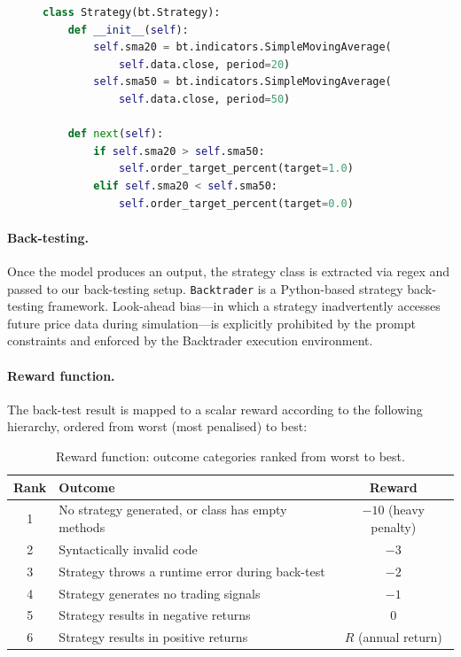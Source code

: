 \documentclass[12pt, a4paper]{report}
\begin{document}
\begin{figure}[htbp]
\begin{lstlisting}[language=Python,
                   caption={Example strategy generated by Qwen2.5-32B (fine-tuned) for TSLA.},
                   label={lst:tsla-strategy},
                   basicstyle=\ttfamily\footnotesize]
class Strategy(bt.Strategy):
    def __init__(self):
        self.sma20 = bt.indicators.SimpleMovingAverage(
            self.data.close, period=20)
        self.sma50 = bt.indicators.SimpleMovingAverage(
            self.data.close, period=50)

    def next(self):
        if self.sma20 > self.sma50:
            self.order_target_percent(target=1.0)
        elif self.sma20 < self.sma50:
            self.order_target_percent(target=0.0)
\end{lstlisting}
\end{figure}

\paragraph{Back-testing.}
Once the model produces an output, the strategy class is extracted via regex and passed
to our back-testing setup. \texttt{Backtrader} \cite{backtrader2024} is a
Python-based strategy back-testing framework. Look-ahead bias---in which a strategy
inadvertently accesses future price data during simulation---is explicitly prohibited by
the prompt constraints and enforced by the Backtrader execution environment.

\paragraph{Reward function.}
The back-test result is mapped to a scalar reward according to the following hierarchy,
ordered from worst (most penalised) to best:

\begin{table}[htbp]
  \centering
  \caption{Reward function: outcome categories ranked from worst to best.}
  \label{tab:reward}
  \begin{tabular}{clc}
    \toprule
    Rank & Outcome & Reward \\
    \midrule
    1 & No strategy generated, or class has empty methods & $-10$ (heavy penalty) \\
    2 & Syntactically invalid code                        & $-3$ \\
    3 & Strategy throws a runtime error during back-test  & $-2$ \\
    4 & Strategy generates no trading signals             & $-1$ \\
    5 & Strategy results in negative returns              & $0$  \\
    6 & Strategy results in positive returns              & $R$ (annual return) \\
    \bottomrule
  \end{tabular}
\end{table}
\end{document}
